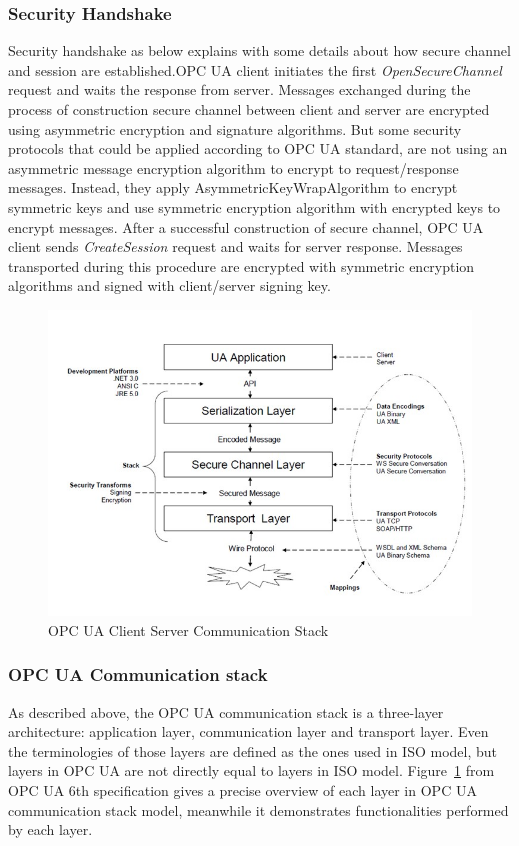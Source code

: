 \documentclass[]{llncs}
\begin{document}
\subsubsection{Security Handshake}
Security handshake as below explains with some details about how secure channel and session are established.OPC UA client initiates the first \emph{OpenSecureChannel} request and waits the response from server. Messages exchanged during the process of construction secure channel between client and server are encrypted using asymmetric encryption and signature algorithms. But some security protocols that could be applied according to OPC UA standard, are not using an asymmetric message encryption algorithm to encrypt to request/response messages. Instead, they apply AsymmetricKeyWrapAlgorithm to encrypt symmetric keys and use symmetric encryption algorithm with encrypted keys to encrypt messages. After a successful construction of secure channel, OPC UA client sends \emph{CreateSession} request and waits for server response. Messages transported during this procedure are encrypted with symmetric encryption algorithms and signed with client/server signing key.
\begin{figure}[h!]
	\centering
	\includegraphics[width=1\textwidth]{opc_ua_commstack.jpg}
		\caption[ ]{OPC UA Client Server Communication Stack\cite{O2}}
	\label{fig:opc_ua_commstack}
\end{figure}

\subsubsection{OPC UA Communication stack}
As described above, the OPC UA communication stack is a three-layer architecture: application layer, communication layer and transport layer. Even the terminologies of those layers are defined as the ones used in ISO model, but layers in OPC UA are not directly equal to layers in ISO model. Figure~\ref{fig:opc_ua_commstack} from OPC UA  6th specification\cite{O6} gives a precise overview of each layer in OPC UA communication stack model, meanwhile it demonstrates functionalities performed by each layer.
\end{document}

